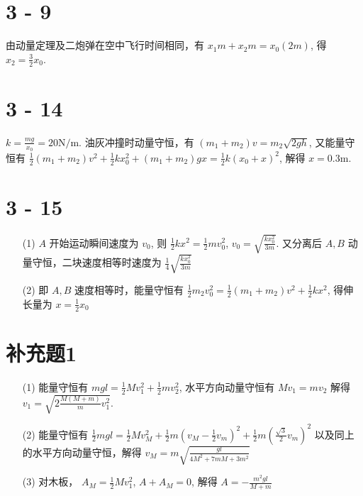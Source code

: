\documentclass{article}
\begin{document}
\section*{3 - 9}

由动量定理及二炮弹在空中飞行时间相同，有 $x_1m + x_2m = x_0(2m)$, 得 $x_2 = \frac{3}{2}x_0$.

\section*{3 - 14}

$k = \frac{mg}{x_0} = 20 \mathrm{N/m}$. 油灰冲撞时动量守恒，有 $(m_1 + m_2)v = m_2\sqrt{2gh}$, 又能量守恒有 $\frac{1}{2}(m_1 + m_2)v^2 + \frac{1}{2}kx_0^2 + (m_1 + m_2)gx = \frac{1}{2}k(x_0 + x)^2$, 解得 $x = 0.3 \mathrm{m}$.

\section*{3 - 15}

\begin{itemize}
    \item [(1)] $A$ 开始运动瞬间速度为 $v_0$, 则 $\frac{1}{2}kx^2 = \frac{1}{2}mv_0^2$, $v_0 = \sqrt{\frac{kx_0^2}{3m}}$. 又分离后 $A, B$ 动量守恒，二块速度相等时速度为 $\frac{1}{4}\sqrt{\frac{kx_0^2}{3m}}$
    \item [(2)] 即 $A, B$ 速度相等时，能量守恒有 $\frac{1}{2}m_2v_0^2 = \frac{1}{2}(m_1 + m_2)v^2 + \frac{1}{2}kx^2$, 得伸长量为 $x = \frac{1}{2}x_0$
\end{itemize}

\section*{补充题1}

\begin{itemize}
    \item [(1)] 能量守恒有 $mgl = \frac{1}{2}Mv_1^2 + \frac{1}{2}mv_2^2$, 水平方向动量守恒有 $Mv_1 = mv_2$ 解得 $v_1 = \sqrt{2\frac{M(M + m)}{m}v_1^2}$. 
    \item [(2)] 能量守恒有 $\frac{1}{2}mgl = \frac{1}{2}Mv_M^2 + \frac{1}{2}m\left(v_M - \frac{1}{2}v_m\right)^2 + \frac{1}{2}m\left(\frac{\sqrt{3}}{2}v_m\right)^2$ 以及同上的水平方向动量守恒，解得 $v_M = m\sqrt{\frac{gl}{4M^2 + 7mM + 3m^2}}$
    \item [(3)] 对木板， $A_M = \frac{1}{2}Mv_1^2$, $A + A_M = 0$, 解得 $A = -\frac{m^2gl}{M + m}$
\end{itemize}
\end{document}
